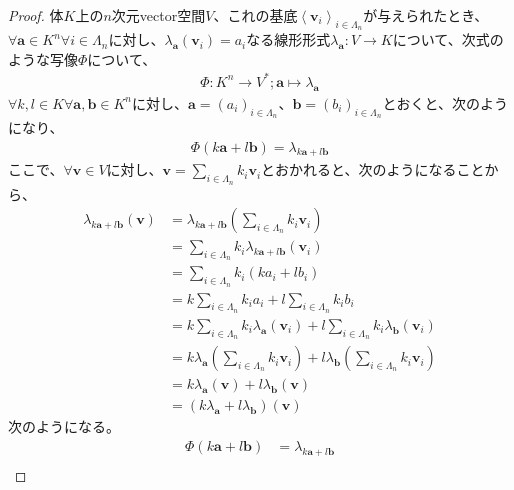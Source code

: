 \documentclass[dvipdfmx]{jsarticle}
\begin{document}
\begin{proof}
体$K$上の$n$次元vector空間$V$、これの基底$\left\langle \mathbf{v}_{i} \right\rangle_{i \in \varLambda_{n}}$が与えられたとき、$\forall\mathbf{a} \in K^{n}\forall i \in \varLambda_{n}$に対し、$\lambda_{\mathbf{a}}\left( \mathbf{v}_{i} \right) = a_{i}$なる線形形式$\lambda_{\mathbf{a}}:V \rightarrow K$について、次式のような写像$\varPhi$について、
\begin{align*}
\varPhi:K^{n} \rightarrow V^{*};\mathbf{a} \mapsto \lambda_{\mathbf{a}}
\end{align*}
$\forall k,l \in K\forall\mathbf{a},\mathbf{b} \in K^{n}$に対し、$\mathbf{a} = \left( a_{i} \right)_{i \in \varLambda_{n}}$、$\mathbf{b} = \left( b_{i} \right)_{i \in \varLambda_{n}}$とおくと、次のようになり、
\begin{align*}
\varPhi\left( k\mathbf{a} + l\mathbf{b} \right) = \lambda_{k\mathbf{a} + l\mathbf{b}}
\end{align*}
ここで、$\forall\mathbf{v} \in V$に対し、$\mathbf{v} = \sum_{i \in \varLambda_{n}} {k_{i}\mathbf{v}_{i}}$とおかれると、次のようになることから、
\begin{align*}
\lambda_{k\mathbf{a} + l\mathbf{b}}\left( \mathbf{v} \right) &= \lambda_{k\mathbf{a} + l\mathbf{b}}\left( \sum_{i \in \varLambda_{n}} {k_{i}\mathbf{v}_{i}} \right)\\
&= \sum_{i \in \varLambda_{n}} {k_{i}\lambda_{k\mathbf{a} + l\mathbf{b}}\left( \mathbf{v}_{i} \right)}\\
&= \sum_{i \in \varLambda_{n}} {k_{i}\left( ka_{i} + lb_{i} \right)}\\
&= k\sum_{i \in \varLambda_{n}} {k_{i}a_{i}} + l\sum_{i \in \varLambda_{n}} {k_{i}b_{i}}\\
&= k\sum_{i \in \varLambda_{n}} {k_{i}\lambda_{\mathbf{a}}\left( \mathbf{v}_{i} \right)} + l\sum_{i \in \varLambda_{n}} {k_{i}\lambda_{\mathbf{b}}\left( \mathbf{v}_{i} \right)}\\
&= k\lambda_{\mathbf{a}}\left( \sum_{i \in \varLambda_{n}} {k_{i}\mathbf{v}_{i}} \right) + l\lambda_{\mathbf{b}}\left( \sum_{i \in \varLambda_{n}} {k_{i}\mathbf{v}_{i}} \right)\\
&= k\lambda_{\mathbf{a}}\left( \mathbf{v} \right) + l\lambda_{\mathbf{b}}\left( \mathbf{v} \right)\\
&= \left( k\lambda_{\mathbf{a}} + l\lambda_{\mathbf{b}} \right)\left( \mathbf{v} \right)
\end{align*}
次のようになる。
\begin{align*}
\varPhi\left( k\mathbf{a} + l\mathbf{b} \right) &= \lambda_{k\mathbf{a} + l\mathbf{b}}\\

\end{align*}
\end{proof}
\end{document}
